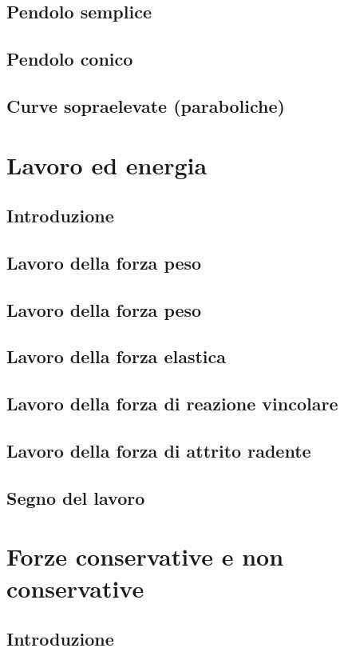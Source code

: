 \documentclass[a4paper]{article}
\begin{document}
\subsection{Pendolo semplice}
\subsection{Pendolo conico}
\subsection{Curve sopraelevate (paraboliche)}

\section{Lavoro ed energia}
\subsection{Introduzione}
\subsection{Lavoro della forza peso}
\subsection{Lavoro della forza peso}
\subsection{Lavoro della forza elastica}
\subsection{Lavoro della forza di reazione vincolare}
\subsection{Lavoro della forza di attrito radente}
\subsection{Segno del lavoro}

\newpage

\section{Forze conservative e non conservative}
\subsection{Introduzione}
\end{document}
